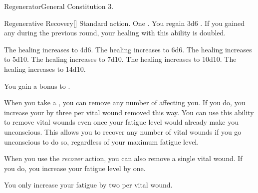   \begin{feat}{Regenerator}{General}
    \featpre Constitution 3.

    \begin{activeability}{Regenerative Recovery}[]
      \abilityusagetime Standard action.
      \abilitycost One .
      \rankline
      You regain 3d6 .
      If you gained any  during the previous round, your healing with this ability is doubled.

      \rankline
       The healing increases to 4d6.
       The healing increases to 6d6.
       The healing increases to 5d10.
       The healing increases to 7d10.
       The healing increases to 10d10.
       The healing increases to 14d10.
    \end{activeability}

     You gain a  bonus to .

     When you take a , you can remove any number of  affecting you.
    If you do, you increase your  by three per vital wound removed this way.
    You can use this ability to remove vital wounds even once your fatigue level would already make you unconscious.
    This allows you to recover any number of vital wounds if you go unconscious to do so, regardless of your maximum fatigue level.

     When you use the \textit{recover} action, you can also remove a single vital wound.
    If you do, you increase your fatigue level by one.

     You only increase your fatigue by two per vital wound.
  \end{feat}

